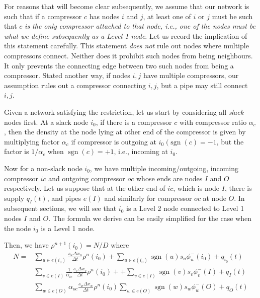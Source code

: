 \documentclass{amsart}
\DeclareMathOperator{\sgn}{sgn}
\begin{document}
For reasons that will become clear subsequently, we assume that our network is such that if a compressor $c$ has nodes $i$ and $j$, at least one of $i$ or $j$  must be such that $c$ \emph{is the only compressor attached to that node, i.e., one of the nodes must be what we define subsequently as a Level 1 node}. Let us record the implication of this statement  carefully.
This statement \emph{does not} rule out nodes where multiple compressors connect. Neither does it prohibit  such nodes from being neighbours. It only prevents the connecting edge between two such nodes from being a compressor. Stated another way, if nodes $i, j$ have multiple compressors, our assumption rules out a compressor connecting $i,j$, but a pipe may still connect $i, j$. 

Given a network satisfying the restriction, let us start by considering all \emph{slack} nodes first.
At a slack node $i_0$, if there is a compressor $c$ with compressor ratio $\alpha_c$, then the density at the node lying at other end of  the compressor is given by multiplying factor $\alpha_c$ if compressor is outgoing at $i_0 \; (\sgn(c) = -1$, but the factor is $1/\alpha_c$ when $\sgn(c) = +1$, i.e., incoming at $i_0$.



Now for a non-slack node $i_0$, we have multiple incoming/outgoing, incoming compressor $ic$ and outgoing compressor $oc$ whose ends are nodes $I$ and $O$ respectively.
Let us suppose that at the other end of $ic$, which is node $I$, there is supply $q_{I}(t)$, and pipes $e(I)$ and similarly for compressor $oc$ at node $O$. In subsequent sections, we will see that $i_0$ is a Level 2 node connected to Level 1 nodes $I$ and $O$. The formula we derive can be easily simplified for the case when the node $i_0$ is a Level 1 node.

Then, we have $\rho^{n+1}(i_0) = N/D$ 
where
\begin{align*}
N = & \sum_{u \in e(i_0)}\frac{s_u \Delta x_u}{\Delta t}\rho^n(i_0) +  \sum_{u \in e(i_0) }\sgn(u) s_u \phi_{u}^-(i_0) + q_{i_0}(t) \\ 
& \sum_{v \in e(I)}\frac{1}{\alpha_{ic}} \frac{s_{v} \Delta x_{v}}{\Delta t} \rho^n(i_0) + 
+ \sum_{v \in e(I)}\sgn(v) s_{v} \phi_{v}^-(I) + q_I(t) \\
& \sum_{w \in e(O)}\alpha_{oc} \frac{s_{w} \Delta x_{w}}{\Delta t} \rho^n(i_0) 
\sum_{w \in e(O)}\sgn(w) s_{w} \phi_{w}^-(O) +  q_{O}(t)   \\
\end{align*}
\end{document}
